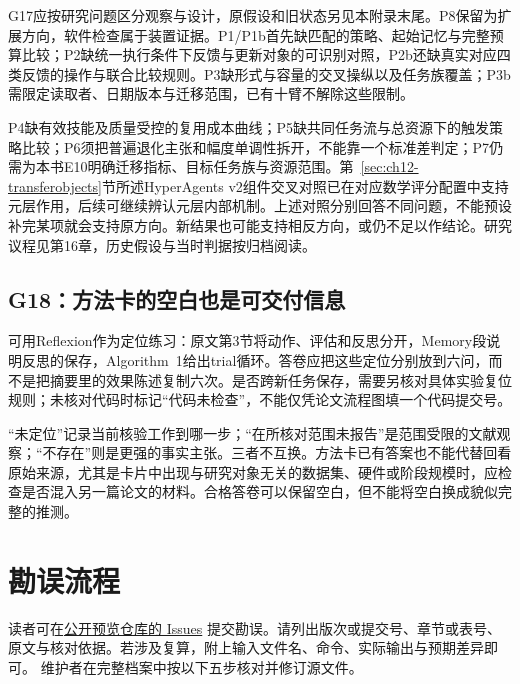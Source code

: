 \leavevmode{}\label{sol:g17}G17应按研究问题区分观察与设计，原假设和旧状态另见本附录末尾。P8保留为扩展方向，软件检查属于装置证据。P1/P1b首先缺匹配的策略、起始记忆与完整预算比较；P2缺统一执行条件下反馈与更新对象的可识别对照，P2b还缺真实对应四类反馈的操作与联合比较规则。P3缺形式与容量的交叉操纵以及任务族覆盖；P3b需限定读取者、日期版本与迁移范围，已有十臂不解除这些限制。

P4缺有效技能及质量受控的复用成本曲线；P5缺共同任务流与总资源下的触发策略比较；P6须把普遍退化主张和幅度单调性拆开，不能靠一个标准差判定；P7仍需为本书E10明确迁移指标、目标任务族与资源范围。第~\ref{sec:ch12-transferobjects}节所述HyperAgents v2组件交叉对照已在对应数学评分配置中支持元层作用，后续可继续辨认元层内部机制。上述对照分别回答不同问题，不能预设补完某项就会支持原方向。新结果也可能支持相反方向，或仍不足以作结论。研究议程见第16章，历史假设与当时判据按归档阅读。

\subsection{G18：方法卡的空白也是可交付信息}\label{sol:g18}

可用Reflexion作为定位练习：原文第3节将动作、评估和反思分开，Memory段说明反思的保存，Algorithm~1给出trial循环\cite{reflexion-2303}。答卷应把这些定位分别放到六问，而不是把摘要里的效果陈述复制六次。是否跨新任务保存，需要另核对具体实验复位规则；未核对代码时标记“代码未检查”，不能仅凭论文流程图填一个代码提交号。

“未定位”记录当前核验工作到哪一步；“在所核对范围未报告”是范围受限的文献观察；“不存在”则是更强的事实主张。三者不互换。方法卡已有答案也不能代替回看原始来源，尤其是卡片中出现与研究对象无关的数据集、硬件或阶段规模时，应检查是否混入另一篇论文的材料。合格答卷可以保留空白，但不能将空白换成貌似完整的推测。

\section{勘误流程}

\begin{sloppypar}
读者可在\href{https://github.com/Palmer-C/understanding-self-evolving-agents/issues}{公开预览仓库的 Issues} 提交勘误。请列出版次或提交号、章节或表号、原文与核对依据。若涉及复算，附上输入文件名、命令、实际输出与预期差异即可。
维护者在完整档案中按以下五步核对并修订源文件。
\end{sloppypar}

